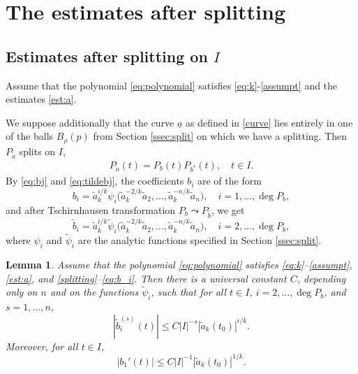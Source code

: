 \documentclass[12pt]{amsart}
\theoremstyle{plain}
\newtheorem{lemma}{Lemma}
\theoremstyle{definition}
\numberwithin{equation}{section}
\begin{document}
\section{The estimates after splitting} \label{bestimates}

\subsection{Estimates after splitting on \texorpdfstring{$I$}{I}}

Assume that the polynomial \eqref{eq:polynomial} satisfies \eqref{eq:k}-\eqref{assumpt} and the estimates \eqref{est:a}.

We suppose additionally  
that the curve $\underline a$ as defined in \eqref{curve} lies entirely in one of the balls $B_{\rho}(p)$ 
from Section \ref{ssec:split} on which we have a splitting. 
Then 
$P_{\tilde a}$ splits on $I$, 
\begin{align}\label{splitting}
  P_{\tilde a}(t) = P_b(t) P_{b^*}(t), \quad t \in I. 
\end{align}
By \eqref{eq:bj} and \eqref{eq:tildebj}, the coefficients $b_i$ are of the form 
\begin{equation} \label{eq:b_i0}
  b_i = \tilde a_k^{i/k} {\psi}_i \big(\tilde a_k^{-2/k} \tilde a_2, \ldots, \tilde a_k^{-n/k} \tilde a_n\big), 
  \quad i = 1,\ldots, \deg P_b,
\end{equation}
and after Tschirnhausen transformation $P_b \leadsto P_{\tilde b}$, we get 
  \begin{equation} \label{eq:b_i}
  \tilde b_i = \tilde a_k^{i/k} \tilde {\psi}_i \big(\tilde a_k^{-2/k} \tilde a_2, \ldots, \tilde a_k^{-n/k} \tilde a_n\big),
  \quad i = 2,\ldots, \deg P_b,
  \end{equation}  
where ${\psi}_i$ and $\tilde {\psi}_i$ are the analytic functions specified in Section \ref{ssec:split}. 

\begin{lemma} \label{lem:B}
  Assume that the polynomial \eqref{eq:polynomial} satisfies \eqref{eq:k}--\eqref{assumpt}, \eqref{est:a}, and \eqref{splitting}--\eqref{eq:b_i}. 
  Then there is a universal constant $C$, depending only on $n$ and on the functions $\tilde {\psi}_i$, 
  such that for all $t \in I$, $i=2,\ldots,\deg P_b$, and $s = 1,\ldots,n$,
  \begin{equation} \label{eq:b_ider}
      |\tilde b_i^{(s)}(t) | \le C  |I|^{-s}  |\tilde a_k (t_0)|^{i/k}.   
  \end{equation}  
  Moreover, for all $t \in I$,
  \begin{equation} \label{b1prime}
      |b_1'(t) | \le C  |I|^{-1}  |\tilde a_k (t_0)|^{1/k}.   
  \end{equation}
\end{lemma}
\end{document}
